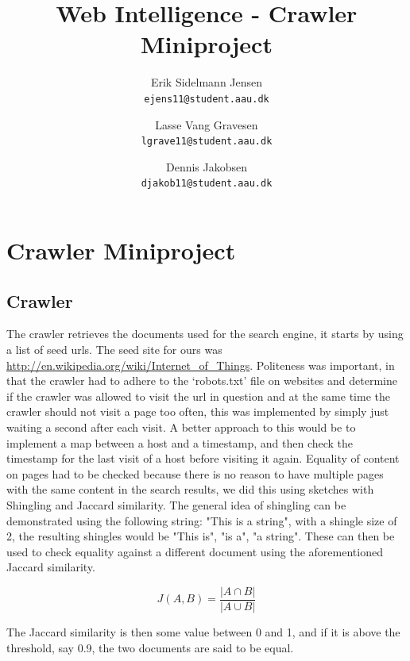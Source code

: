 

\author{
  Erik Sidelmann Jensen\\
  \texttt{ejens11@student.aau.dk}
  \and
  Lasse Vang Gravesen\\
  \texttt{lgrave11@student.aau.dk}
  \and
  Dennis Jakobsen\\
  \texttt{djakob11@student.aau.dk}  
}

\title{Web Intelligence - Crawler Miniproject}
\date{}


	\clearpage\maketitle
	\thispagestyle{empty}
	
	\chapter{Crawler Miniproject}
	\section{Crawler}
	The crawler retrieves the documents used for the search engine, it starts by using a list of seed urls.
	The seed site for ours was \url{http://en.wikipedia.org/wiki/Internet_of_Things}.
	Politeness was important, in that the crawler had to adhere to the `robots.txt' file on websites and determine if the crawler was allowed to visit the url in question and at the same time the crawler should not visit a page too often, this was implemented by simply just waiting a second after each visit. A better approach to this would be to implement a map between a host and a timestamp, and then check the timestamp for the last visit of a host before visiting it again.
	Equality of content on pages had to be checked because there is no reason to have multiple pages with the same content in the search results, we did this using sketches with Shingling and Jaccard similarity. The general idea of shingling can be demonstrated using the following string: "This is a string", with a shingle size of 2, the resulting shingles would be "This is", "is a", "a string". These can then be used to check equality against a different document using the aforementioned Jaccard similarity. 
	
	$$ J(A,B) = \frac{| A \cap B |}{|A \cup B|} $$
	
	The Jaccard similarity is then some value between 0 and 1, and if it is above the threshold, say 0.9, the two documents are said to be equal.
	
